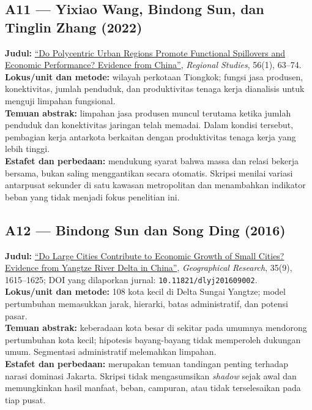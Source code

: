\documentclass[
  indonesian,
  11pt,
  a4paper,
  oneside,
  openany]{report}
\begin{document}
\subsection{A11 --- Yixiao Wang, Bindong Sun, dan Tinglin Zhang
(2022)}\label{a11-yixiao-wang-bindong-sun-dan-tinglin-zhang-2022}

\textbf{Judul:}
\href{https://doi.org/10.1080/00343404.2020.1841147}{``Do Polycentric
Urban Regions Promote Functional Spillovers and Economic Performance?
Evidence from China''}, \emph{Regional Studies}, 56(1), 63--74.\\
\textbf{Lokus/unit dan metode:} wilayah perkotaan Tiongkok; fungsi jasa
produsen, konektivitas, jumlah penduduk, dan produktivitas tenaga kerja
dianalisis untuk menguji limpahan fungsional.\\
\textbf{Temuan abstrak:} limpahan jasa produsen muncul terutama ketika
jumlah penduduk dan konektivitas jaringan telah memadai. Dalam kondisi
tersebut, pembagian kerja antarkota berkaitan dengan produktivitas
tenaga kerja yang lebih tinggi.\\
\textbf{Estafet dan perbedaan:} mendukung syarat bahwa massa dan relasi
bekerja bersama, bukan saling menggantikan secara otomatis. Skripsi
menilai variasi antarpusat sekunder di satu kawasan metropolitan dan
menambahkan indikator beban yang tidak menjadi fokus penelitian ini.

\subsection{A12 --- Bindong Sun dan Song Ding
(2016)}\label{a12-bindong-sun-dan-song-ding-2016}

\textbf{Judul:}
\href{https://www.dlyj.ac.cn/EN/10.11821/dlyj201609002}{``Do Large
Cities Contribute to Economic Growth of Small Cities? Evidence from
Yangtze River Delta in China''}, \emph{Geographical Research}, 35(9),
1615--1625; DOI yang dilaporkan jurnal:
\texttt{10.11821/dlyj201609002}.\\
\textbf{Lokus/unit dan metode:} 108 kota kecil di Delta Sungai Yangtze;
model pertumbuhan memasukkan jarak, hierarki, batas administratif, dan
potensi pasar.\\
\textbf{Temuan abstrak:} keberadaan kota besar di sekitar pada umumnya
mendorong pertumbuhan kota kecil; hipotesis bayang-bayang tidak
memperoleh dukungan umum. Segmentasi administratif melemahkan
limpahan.\\
\textbf{Estafet dan perbedaan:} merupakan temuan tandingan penting
terhadap narasi dominasi Jakarta. Skripsi tidak mengasumsikan
\emph{shadow} sejak awal dan memungkinkan hasil manfaat, beban,
campuran, atau tidak terselesaikan pada tiap pusat.
\end{document}
